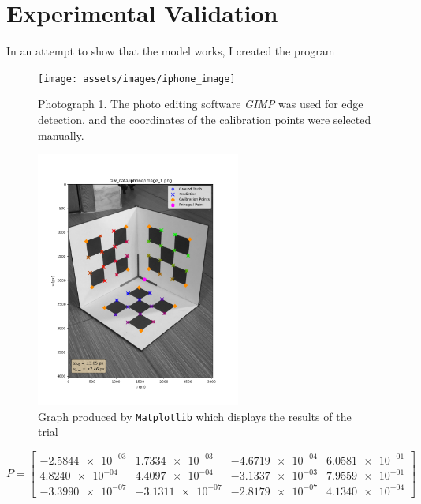 \section{Experimental Validation}

In an attempt to show that the model works, I created the program

\begin{figure}[H]
    \centering
    \texttt{[image: assets/images/iphone\_image]}
    \caption{Photograph 1. The photo editing software \emph{GIMP} was used for edge detection, and the coordinates of the calibration points were selected manually. }
\end{figure}



\begin{figure}[H]
    \centering
    \includegraphics[width=0.6\textwidth]{assets/graphs/iphone_graph}
    \caption{Graph produced by \texttt{Matplotlib} which displays the results of the trial}
\end{figure}

\begin{equation*}
    P =
    \begin{bmatrix}
        \num{-2.5844e-03} & \num{1.7334e-03}  & \num{-4.6719e-04} & \num{6.0581e-01} \\
        \num{4.8240e-04}  & \num{4.4097e-04}  & \num{-3.1337e-03} & \num{7.9559e-01} \\
        \num{-3.3990e-07} & \num{-3.1311e-07} & \num{-2.8179e-07} & \num{4.1340e-04}
    \end{bmatrix}
\end{equation*}

